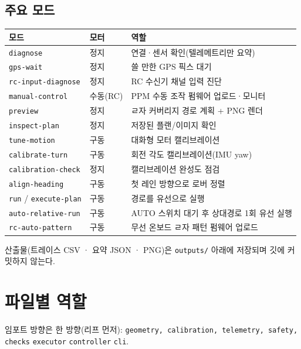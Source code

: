 \documentclass[11pt,a4paper]{article}
\newcommand{\code}[1]{\nolinkurl{#1}}
\newcommand{\ra}{\textrightarrow}
\newcommand{\cmdnote}[1]{{\footnotesize\color{muted}#1}\par}
\begin{document}
\subsection{주요 모드}
\begin{center}
\renewcommand{\arraystretch}{1.28}
\begin{tabularx}{\linewidth}{@{}l l X@{}}
\toprule
\textbf{모드} & \textbf{모터} & \textbf{역할}\\
\midrule
\code{diagnose}          & 정지     & 연결·센서 확인(텔레메트리만 요약)\\
\code{gps-wait}          & 정지     & 쓸 만한 GPS 픽스 대기\\
\code{rc-input-diagnose} & 정지     & RC 수신기 채널 입력 진단\\
\code{manual-control}    & 수동(RC) & PPM 수동 조작 펌웨어 업로드·모니터\\
\code{preview}           & 정지     & ㄹ자 커버리지 경로 계획 + PNG 렌더\\
\code{inspect-plan}      & 정지     & 저장된 플랜/이미지 확인\\
\code{tune-motion}       & 구동     & 대화형 모터 캘리브레이션\\
\code{calibrate-turn}    & 구동     & 회전 각도 캘리브레이션(IMU yaw)\\
\code{calibration-check} & 정지     & 캘리브레이션 완성도 점검\\
\code{align-heading}     & 구동     & 첫 레인 방향으로 로버 정렬\\
\code{run} / \code{execute-plan} & 구동 & 경로를 유선으로 실행\\
\code{auto-relative-run} & 구동     & AUTO 스위치 대기 후 상대경로 1회 유선 실행\\
\code{rc-auto-pattern}   & 구동     & 무선 온보드 ㄹ자 패턴 펌웨어 업로드\\
\bottomrule
\end{tabularx}
\end{center}
\cmdnote{산출물(트레이스 CSV · 요약 JSON · PNG)은 \code{outputs/} 아래에 저장되며 깃에 커밋하지 않는다.}

\section{파일별 역할}

임포트 방향은 한 방향(리프 먼저):
\code{geometry, calibration, telemetry, safety, checks} \ra{} \code{executor}
\ra{} \code{controller} \ra{} \code{cli}.
\end{document}
